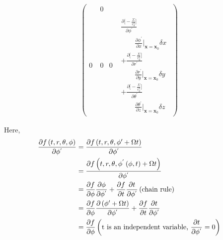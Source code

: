 \documentclass[english]{article}
\begin{document}
\begin{align*}
\begin{pmatrix}
\begin{array}{c}
\end{array} & 0\\
0 & 0 & 0 & \begin{array}{c}
\frac{\partial\biggl[-\frac{\Sigma}{r^{2}_{0}}\biggr]}{\partial\phi^{'}}\\
\qquad\frac{\partial\phi^{'}}{\partial x}\big|_{\boldsymbol{x}=\boldsymbol{x}_{0}}\delta x\\
+\frac{\partial\biggl[-\frac{\Sigma}{r^{2}_{0}}\biggr]}{\partial r^{'}}\\
\qquad\frac{\partial r^{'}}{\partial y}\big|_{\boldsymbol{x}=\boldsymbol{x}_{0}}\delta y\\
+\frac{\partial\biggl[-\frac{\Sigma}{r^{2}_{0}}\biggr]}{\partial\theta^{'}}\\
\qquad\frac{\partial\theta^{'}}{\partial z}\big|_{\boldsymbol{x}=\boldsymbol{x}_{0}}\delta z
\end{array}
\end{pmatrix}
\end{align*}

Here, 
\begin{align*}
\frac{\partial f\left(t,r,\theta,\phi\right)}{\partial\phi^{'}} & =\frac{\partial f\left(t,r,\theta,\phi'+\Omega t\right)}{\partial\phi^{'}}\\
 & =\frac{\partial f\left(t,r,\theta,\phi^{'}\left(\phi,t\right)+\Omega t\right)}{\partial\phi^{'}}\\
 & =\frac{\partial f}{\partial\phi}\frac{\partial\phi}{\partial\phi^{'}}+\frac{\partial f}{\partial t}\frac{\partial t}{\partial\phi^{'}}\hfill\left(\text{chain rule}\right)\\
 & =\frac{\partial f}{\partial\phi}\frac{\partial\left(\phi'+\Omega t\right)}{\partial\phi^{'}}+\frac{\partial f}{\partial t}\frac{\partial t}{\partial\phi^{'}}\\
 & =\frac{\partial f}{\partial\phi}\hfill\left(\text{t is an independent variable, \ensuremath{\frac{\partial t}{\partial\phi^{'}}=0}}\right)
\end{align*}
\end{document}
